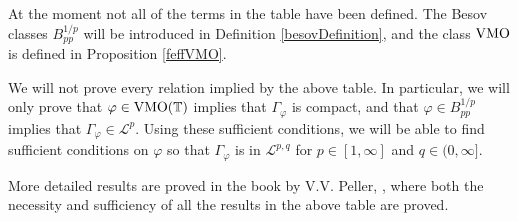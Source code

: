 At the moment not all of the terms in the table have been defined. The Besov
classes $B_{pp}^{1/p}$ will be introduced in Definition \ref{besovDefinition},
and the class $\operatorname{VMO}$ is defined in Proposition \ref{feffVMO}.

We will not prove every relation implied by the above table. In particular, we will
only prove that $\varphi \in \operatorname{VMO}(\mathbb{T})$ implies that $\Gamma_\varphi$ is compact,
and that $\varphi \in B_{pp}^{1/p}$ implies that $\Gamma_\varphi \in \mathcal{L}^p$.
Using these sufficient conditions, we will be able to find sufficient conditions
on $\varphi$ so that $\Gamma_\varphi$ is in $\mathcal{L}^{p,q}$ for $p \in [1,\infty]$
and $q \in (0,\infty]$. 

More detailed results are proved in the book by V.V. Peller, \cite{Peller2003},
where both the necessity and sufficiency of all the results in the above table are proved.

